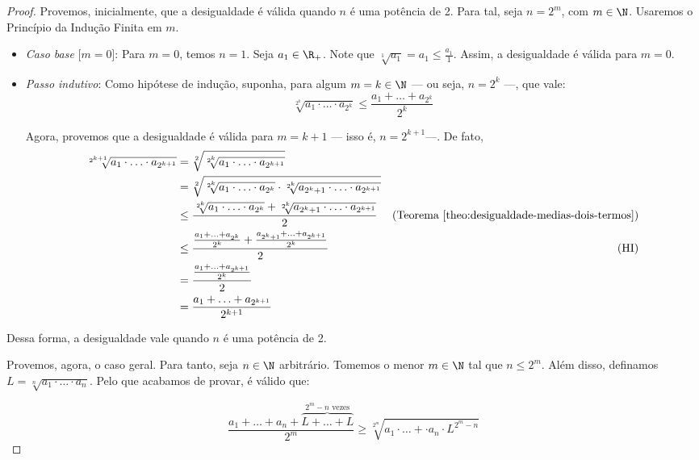 \begin{proof}
	Provemos, inicialmente, que a desigualdade é válida quando $n$ é uma potência de 2.
	Para tal, seja $n = 2^m$, com $m \in \N$.
	Usaremos o Princípio da Indução Finita em $m$.

	\begin{itemize}
		\item \emph{Caso base} [$m=0$]: Para $m=0$, temos $n=1$. 
		Seja $a_1 \in \R_+$. 
		Note que $\sqrt[1]{a_1}=a_1\le \frac{a_1}{1}$.
		Assim, a desigualdade é válida para $m=0$.

		\item \emph{Passo indutivo}: Como hipótese de indução, suponha, para algum $m=k\in \N$ --- ou seja, $n=2^k$ ---, que vale:
		$$
		\sqrt[2^k]{a_1 \cdot \dots \cdot a_{2^k}}\le \frac{a_1 + \dots + a_{2^k}}{2^k}
		$$

		Agora, provemos que a desigualdade é válida para $m=k+1$ --- isso é, $n = 2^{k+1}$---. De fato,
		\begin{align*}
		\sqrt[2^{k+1}]{a_1 \cdot \ldots \cdot a_{2^{k+1}}} &= \sqrt[2]{\sqrt[2^k]{a_1 \cdot \ldots \cdot a_{2^{k+1}}}}&  \\
		& = \sqrt[2]{ \sqrt[2^k]{a_1 \cdot \ldots \cdot a_{2^k}} \cdot \sqrt[2^k]{a_{2^k+1} \cdot \ldots \cdot a_{2^{k+1}}}}& \\
		& \le \frac{\sqrt[2^k]{a_1 \cdot \ldots \cdot a_{2^k}} + \sqrt[2^k]{a_{2^k+1} \cdot \ldots \cdot a_{2^{k+1}}}  }{2} & \text{(Teorema \ref{theo:desigualdade-medias-dois-termos})}\\
		& \le \frac{ \frac{a_1 + \ldots + a_{2^k}}{2^k} + \frac{a_{2^k+1}+\ldots+a_{2^{k+1}}}{2^k}    }{2} & \text{(HI)}\\
		& = \frac{\frac{a_1 + \ldots + a_{2^{k+1}}}{2^k}}{2} & \\
		& = \frac{a_1 + \ldots + a_{2^{k+1}}}{2^{k+1}}  &
		\end{align*}
		
	\end{itemize}

	Dessa forma, a desigualdade vale quando $n$ é uma potência de 2.

	Provemos, agora, o caso geral.
	Para tanto, seja $n \in \N$ arbitrário.
	Tomemos o menor $m \in \N$ tal que $n \le 2^m$.
	Além disso, definamos $L = \sqrt[n]{a_1 \cdot \ldots \cdot a_n}$.
	Pelo que acabamos de provar, é válido que:

	$$
	\frac{a_1 + \ldots + a_n + \overbrace{L+\ldots + L}^{2^m - n \text{ vezes}}}{2^m} \ge \sqrt[2^m]{a_1 \cdot \ldots +\cdot a_n \cdot L^{2^m-n}}
	$$


\end{proof}
